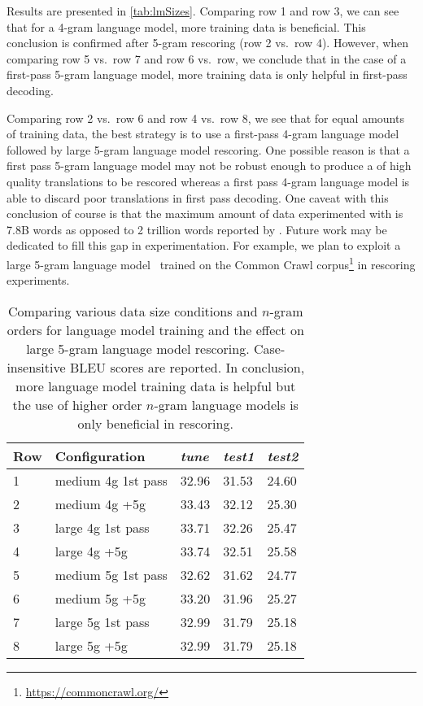 Results are presented in \autoref{tab:lmSizes}.
Comparing row 1 and row 3, we can see that for a 4-gram
language model, more training data is beneficial.
This conclusion is confirmed after 5-gram rescoring (row 2 vs.\ row 4).
However, when comparing row 5 vs.\ row 7 and row 6 vs.\ row, we conclude that
in the case of a first-pass 5-gram language model, more training
data is only helpful in first-pass decoding.

Comparing row 2 vs.\ row 6 and row 4 vs.\ row 8, we see
that for equal amounts of training data, the best strategy
is to use a first-pass 4-gram language model followed by
large 5-gram language model rescoring. One possible reason
is that a first pass 5-gram language model may not be robust enough
to produce a of high quality translations to be rescored whereas
a first pass 4-gram language model is able to discard poor translations in first pass
decoding.
One caveat with this
conclusion of course is that the maximum amount of data experimented
with is 7.8B words as opposed to 2 trillion words reported
by \citet{brants-popat-xu-och-dean:2007:EMNLP-CoNLL}. Future work may be dedicated to fill this gap in experimentation.
For example, we plan to exploit a large 5-gram language model~\citep{buck-heafield-vanooyen:2014:LREC}
trained on the Common Crawl corpus\footnote{\url{https://commoncrawl.org/}}
in rescoring experiments.
%
\begin{table}
  \begin{center}
    \begin{tabular}{l|l|lll}
      Row & Configuration & \emph{tune} & \emph{test1} & \emph{test2} \\
      \hline
      1 & medium 4g 1st pass & 32.96 & 31.53 & 24.60 \\
      2 & medium 4g +5g &       33.43 & 32.12 & 25.30 \\
      \hline
      3 & large 4g 1st pass  & 33.71 & 32.26 & 25.47 \\
      4 & large 4g +5g       & 33.74 & 32.51 & 25.58 \\
      \hline
      5 & medium 5g 1st pass & 32.62 & 31.62 & 24.77 \\
      6 & medium 5g +5g       & 33.20 & 31.96 & 25.27 \\
      \hline
      7 & large 5g 1st pass  & 32.99 & 31.79 & 25.18 \\
      8 & large 5g +5g       & 32.99 & 31.79 & 25.18 \\
    \end{tabular}
    \caption{Comparing various data size conditions and $n$-gram orders
      for language model training and the effect on large 5-gram language
      model rescoring. Case-insensitive BLEU scores are reported.
      In conclusion, more language
      model training data is helpful but the use of higher order $n$-gram language
      models is only beneficial in rescoring.}
    \label{tab:lmSizes}
  \end{center}
\end{table}

